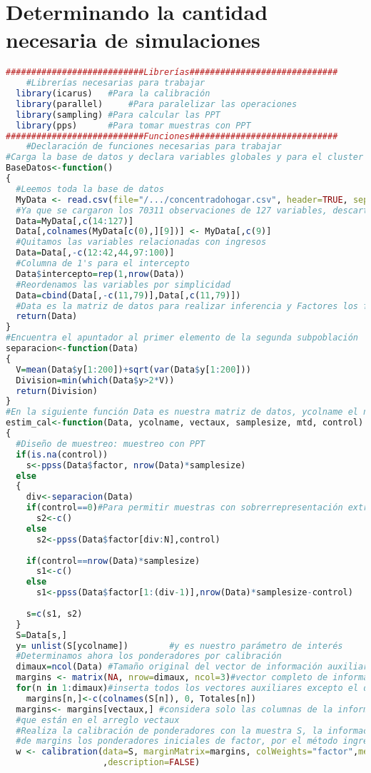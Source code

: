 \documentclass[a4paper,twoside,openright,12pt]{book}
\theoremstyle{definition}
\numberwithin{equation}{chapter}
\numberwithin{figure}{chapter}
\numberwithin{table}{chapter}
\numberwithin{theorem}{chapter}
\numberwithin{lemma}{chapter}
\begin{document}
\chapter{Determinando la cantidad necesaria de simulaciones}\label{anx:B}
\begin{lstlisting}[language=R]
###########################Librerías#############################
	#Librerías necesarias para trabajar
  library(icarus)	#Para la calibración
  library(parallel) 	#Para paralelizar las operaciones
  library(sampling)	#Para calcular las PPT
  library(pps)		#Para tomar muestras con PPT
###########################Funciones#############################
	#Declaración de funciones necesarias para trabajar
#Carga la base de datos y declara variables globales y para el cluster
BaseDatos<-function()
{
  #Leemos toda la base de datos
  MyData <- read.csv(file="/.../concentradohogar.csv", header=TRUE, sep=",")
  #Ya que se cargaron los 70311 observaciones de 127 variables, descartamos las variables categóricas
  Data=MyData[,c(14:127)]
  Data[,colnames(MyData[c(0),][9])] <- MyData[,c(9)]
  #Quitamos las variables relacionadas con ingresos
  Data=Data[,-c(12:42,44,97:100)]
  #Columna de 1's para el intercepto
  Data$intercepto=rep(1,nrow(Data))
  #Reordenamos las variables por simplicidad
  Data=cbind(Data[,-c(11,79)],Data[,c(11,79)])
  #Data es la matriz de datos para realizar inferencia y Factores los factores de expansión
  return(Data)
}
#Encuentra el apuntador al primer elemento de la segunda subpoblación
separacion<-function(Data)
{
  V=mean(Data$y[1:200])+sqrt(var(Data$y[1:200]))
  Division=min(which(Data$y>2*V))
  return(Division)
}
#En la siguiente función Data es nuestra matriz de datos, ycolname el nombre de la variable de interés vectaux las columnas que forman los vectores de información auxiliar, samplesize el tamaño de muestra y mtd el método de calibración
estim_cal<-function(Data, ycolname, vectaux, samplesize, mtd, control)
{
  #Diseño de muestreo: muestreo con PPT
  if(is.na(control))
    s<-ppss(Data$factor, nrow(Data)*samplesize)
  else
  {
    div<-separacion(Data)
    if(control==0)#Para permitir muestras con sobrerrepresentación extrema
      s2<-c()
    else
      s2<-ppss(Data$factor[div:N],control)
    
    if(control==nrow(Data)*samplesize)
      s1<-c()
    else
      s1<-ppss(Data$factor[1:(div-1)],nrow(Data)*samplesize-control)
    
    s=c(s1, s2)
  }
  S=Data[s,]
  y= unlist(S[ycolname])        #y es nuestro parámetro de interés
  #Determinamos ahora los ponderadores por calibración
  dimaux=ncol(Data) #Tamaño original del vector de información auxiliar
  margins <- matrix(NA, nrow=dimaux, ncol=3)#vector completo de información auxiliar
  for(n in 1:dimaux)#inserta todos los vectores auxiliares excepto el de los factores de expansión
    margins[n,]<-c(colnames(S[n]), 0, Totales[n])
  margins<- margins[vectaux,] #considera solo las columnas de la información auxiliar
  #que están en el arreglo vectaux
  #Realiza la calibración de ponderadores con la muestra S, la información auxiliar
  #de margins los ponderadores iniciales de factor, por el método ingresado mtd
  w <- calibration(data=S, marginMatrix=margins, colWeights="factor",method=mtd
                   ,description=FALSE)
  

\end{lstlisting}
\end{document}
